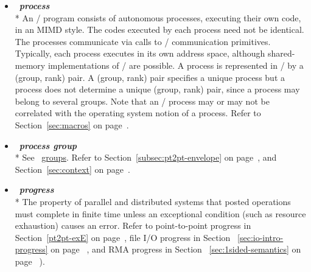 \begin{itemize}
\label{glossary:process}
\item  ~\hypertarget{glossary:process}{\emph{\textbf{process}}} \\*
An \MPI/ program consists of autonomous processes, executing their own
code, in an 
MIMD style. The codes executed by each process need not be
identical.  The processes communicate via calls to \MPI/ communication
primitives.  Typically, each process executes in its own address
space, although shared-memory implementations of \MPI/ are possible.
A process is represented in \MPI/ by a (group, rank) pair. 
A (group, rank) pair specifies a unique process but 
a process does not determine a unique (group, rank) pair, since
a process may belong to several groups.
Note that an \MPI/ process may or may not be correlated with
the operating system notion of a process.
Refer to Section~\ref{sec:macros} on page~\pageref{sec:macros}.

\label{glossary:process_group}
\item  ~\hypertarget{glossary:process_group}{\emph{\textbf{process group}}} \\*
See ~\hyperlink{glossary:groups}{groups}.
Refer to Section~\ref{subsec:pt2pt-envelope} on page~\pageref{subsec:pt2pt-envelope}, and
Section~\ref{sec:context} on page~\pageref{sec:context}.

\label{glossary:progress}
\item  ~\hypertarget{glossary:progress}{\emph{\textbf{progress}}} \\*
The property of parallel and distributed systems that
posted operations must complete in finite time
unless an exceptional condition (such as resource exhaustion)
causes an error.
Refer to point-to-point progress in Section~\ref{pt2pt-exE} on page~\pageref{pt2pt-exE},
file I/O progress in Section ~\ref{sec:io-intro-progress} on page ~\pageref{sec:io-intro-progress},
and RMA progress in Section ~\ref{sec:1sided-semantics} on page ~\pageref{sec:1sided-semantics}).


\end{itemize}
